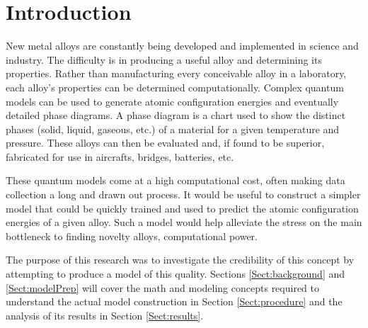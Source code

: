 \section{Introduction}\label{Sect:intro}
\par New metal alloys are constantly being developed and implemented in science and industry. The difficulty is in producing a useful alloy and determining its properties. Rather than manufacturing every conceivable alloy in a laboratory, each alloy's properties can be determined computationally. Complex quantum models can be used to generate atomic configuration energies and eventually detailed phase diagrams. A phase diagram is a chart used to show the distinct phases (solid, liquid, gaseous, etc.) of a material for a given temperature and pressure. These alloys can then be evaluated and, if found to be superior, fabricated for use in aircrafts, bridges, batteries, etc. 
\par These quantum models come at a high computational cost, often making data collection a long and drawn out process. It would be useful to construct a simpler model that could be quickly trained and used to predict the atomic configuration energies of a given alloy. Such a model would help alleviate the stress on the main bottleneck to finding novelty alloys, computational power. 
\par The purpose of this research was to investigate the credibility of this concept by attempting to produce a model of this quality. Sections \ref{Sect:background} and \ref{Sect:modelPrep} will cover the math and modeling concepts required to understand the actual model construction in Section \ref{Sect:procedure} and the analysis of its results in Section \ref{Sect:results}. 